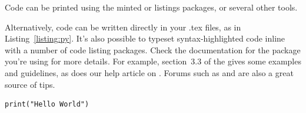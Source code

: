 Code can be printed using the minted or listings packages, or several other tools.


Alternatively, code can be written directly in your .tex files, as in Listing~\ref{listing:py}.
It's also possible to typeset syntax-highlighted code inline with a number of code listing packages.
Check the documentation for the package you're using for more details.
For example, section~3.3 of the  gives some examples and guidelines, as does our help article on . Forums such as  and  are also a great source of tips.

\begin{listing}
\begin{verbatim}
print("Hello World")
\end{verbatim}
\caption{Example Python code}
\label{listing:py}
\end{listing}
